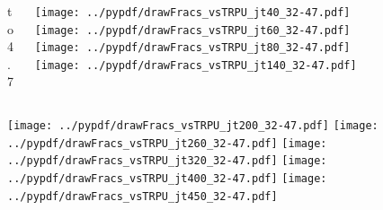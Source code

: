 \documentclass[aspectratio=169]{beamer}
\begin{document}
\begin{figure}[p]
\flushleft
\begin{columns}[T]
\begin{column}{.2\linewidth}
 to 4.7
\end{column}
\begin{column}{.8\linewidth}
\texttt{[image: ../pypdf/drawFracs\_vsTRPU\_jt40\_32-47.pdf]}
\texttt{[image: ../pypdf/drawFracs\_vsTRPU\_jt60\_32-47.pdf]}
\texttt{[image: ../pypdf/drawFracs\_vsTRPU\_jt80\_32-47.pdf]}
\texttt{[image: ../pypdf/drawFracs\_vsTRPU\_jt140\_32-47.pdf]}
\end{column}
\end{columns}
\texttt{[image: ../pypdf/drawFracs\_vsTRPU\_jt200\_32-47.pdf]}
\texttt{[image: ../pypdf/drawFracs\_vsTRPU\_jt260\_32-47.pdf]}
\texttt{[image: ../pypdf/drawFracs\_vsTRPU\_jt320\_32-47.pdf]}
\texttt{[image: ../pypdf/drawFracs\_vsTRPU\_jt400\_32-47.pdf]}
\texttt{[image: ../pypdf/drawFracs\_vsTRPU\_jt450\_32-47.pdf]}
\end{figure}
\end{document}
